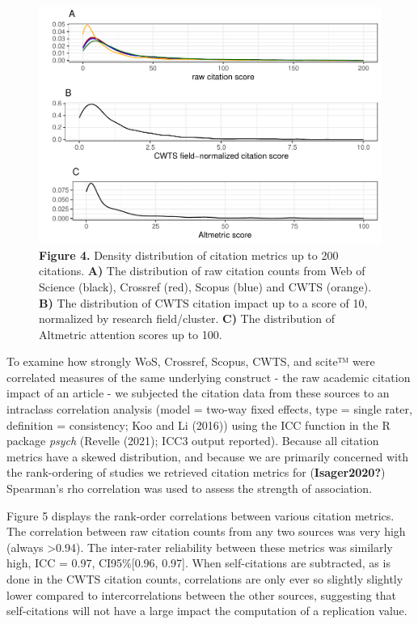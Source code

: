 \documentclass[
  man,floatsintext]{apa6}
\begin{document}
~

\begin{figure}
\centering
\includegraphics{RVcn_feasibility_in_social_neuroscience_cortex_files/figure-latex/fig4-1.pdf}
\caption{\label{fig:fig4}\textbf{Figure 4.} Density distribution of citation metrics up to 200 citations. \textbf{A)} The distribution of raw citation counts from Web of Science (black), Crossref (red), Scopus (blue) and CWTS (orange). \textbf{B)} The distribution of CWTS citation impact up to a score of 10, normalized by research field/cluster. \textbf{C)} The distribution of Altmetric attention scores up to 100.}
\end{figure}

To examine how strongly WoS, Crossref, Scopus, CWTS, and scite™ were correlated measures of the same underlying construct - the raw academic citation impact of an article - we subjected the citation data from these sources to an intraclass correlation analysis (model = two-way fixed effects, type = single rater, definition = consistency; Koo and Li (2016)) using the ICC function in the R package \emph{psych} (Revelle (2021); ICC3 output reported). Because all citation metrics have a skewed distribution, and because we are primarily concerned with the rank-ordering of studies we retrieved citation metrics for (\textbf{Isager2020?}) Spearman's rho correlation was used to assess the strength of association.

Figure 5 displays the rank-order correlations between various citation metrics. The correlation between raw citation counts from any two sources was very high (always \textgreater0.94). The inter-rater reliability between these metrics was similarly high, ICC = 0.97, CI95\%{[}0.96, 0.97{]}. When self-citations are subtracted, as is done in the CWTS citation counts, correlations are only ever so slightly slightly lower compared to intercorrelations between the other sources, suggesting that self-citations will not have a large impact the computation of a replication value.
\end{document}
